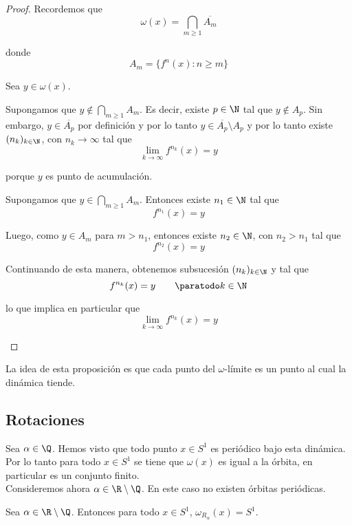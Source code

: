 \documentclass[	docname= Sistemas\ Din\'amicos,
				finished=1,
				semester=1,
				year=2017,
				professor=Godofredo\ Iommi,
				sigla=MAT2565]{apunte}
\begin{document}
\begin{proof} Recordemos que
	$$\omega(x) = \bigcap_{m \geq 1} \overline{A_{m}}$$

donde
	$$A_{m} = \{f^{n}(x) : n \geq m\}$$

Sea $y \in \omega(x)$.
	\begin{casos}
		\item Supongamos que $y \notin \bigcap_{m \geq 1} A_{m}$. Es decir, existe $p \in \N$ tal que $y \notin A_{p}$. Sin embargo, $y \in \overline{A_{p}}$ por definición y por lo tanto $y \in \overline{A_{p}} \setminus A_{p}$ y por lo tanto existe $(n_{k})_{k \in \N}$, con $n_{k} \to \infty$ tal que
				$$\lim_{k \to \infty} f^{n_{k}}(x) = y$$
			
			porque $y$ es punto de acumulación.
			
		\item Supongamos que $y \in \bigcap_{m \geq 1} A_{m}$. Entonces existe $n_{1} \in \N$ tal que
				$$f^{n_{1}}(x) = y$$
			
			Luego, como $y \in A_{m}$ para $m > n_{1}$, entonces existe $n_{2} \in \N$, con $n_{2} > n_{1}$ tal que
				$$f^{n_{2}}(x) = y$$
			
			Continuando de esta manera, obtenemos subsucesión $(n_{k})_{k \in \N}$ y tal que
				$$f^{n_{k}}(x) = y \qquad \paratodo k \in \N$$
			
			lo que implica en particular que
				$$\lim_{k \to \infty} f^{n_{k}}(x) = y$$
	\end{casos}
\end{proof}

\begin{obsp} La idea de esta proposición es que cada punto del $\omega$-límite es un punto al cual la dinámica tiende. 
\end{obsp}

\subsection{Rotaciones}

Sea $\alpha \in \Q$. Hemos visto que todo punto $x \in S^{1}$ es periódico bajo esta dinámica. Por lo tanto para todo $x \in S^{1}$ se tiene que $\omega(x)$ es igual a la órbita, en particular es un conjunto finito.	\\

Consideremos ahora $\alpha \in \R \setminus \Q$. En este caso no existen órbitas periódicas.

\begin{lem*} Sea $\alpha \in \R \setminus \Q$. Entonces para todo $x \in S^{1}$, $\omega_{R_{\alpha}}(x) = S^{1}$.
\end{lem*}
\end{document}
